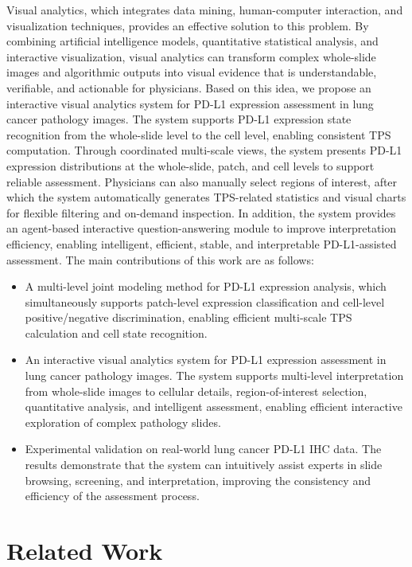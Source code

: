 \documentclass[journal]{vgtc}                     %
\begin{document}
Visual analytics, which integrates data mining, human-computer interaction, and visualization techniques, provides an effective solution to this problem. By combining artificial intelligence models, quantitative statistical analysis, and interactive visualization, visual analytics can transform complex whole-slide images and algorithmic outputs into visual evidence that is understandable, verifiable, and actionable for physicians. Based on this idea, we propose an interactive visual analytics system for PD-L1 expression assessment in lung cancer pathology images. The system supports PD-L1 expression state recognition from the whole-slide level to the cell level, enabling consistent TPS computation. Through coordinated multi-scale views, the system presents PD-L1 expression distributions at the whole-slide, patch, and cell levels to support reliable assessment. Physicians can also manually select regions of interest, after which the system automatically generates TPS-related statistics and visual charts for flexible filtering and on-demand inspection. In addition, the system provides an agent-based interactive question-answering module to improve interpretation efficiency, enabling intelligent, efficient, stable, and interpretable PD-L1-assisted assessment. The main contributions of this work are as follows:
\begin{itemize}
    \item A multi-level joint modeling method for PD-L1 expression analysis, which simultaneously supports patch-level expression classification and cell-level positive/negative discrimination, enabling efficient multi-scale TPS calculation and cell state recognition.
    \item An interactive visual analytics system for PD-L1 expression assessment in lung cancer pathology images. The system supports multi-level interpretation from whole-slide images to cellular details, region-of-interest selection, quantitative analysis, and intelligent assessment, enabling efficient interactive exploration of complex pathology slides.
    \item Experimental validation on real-world lung cancer PD-L1 IHC data. The results demonstrate that the system can intuitively assist experts in slide browsing, screening, and interpretation, improving the consistency and efficiency of the assessment process.
\end{itemize}

\section{Related Work}
\end{document}
